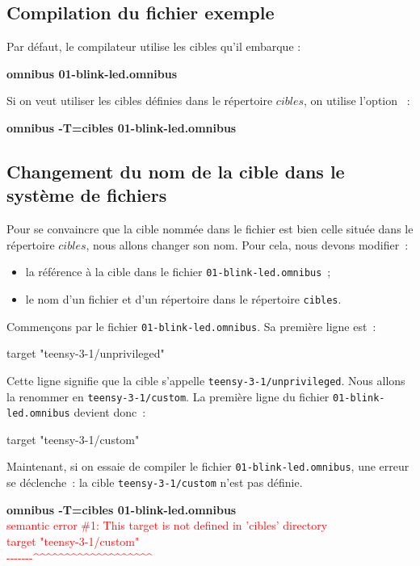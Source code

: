 \subsection{Compilation du fichier exemple}
Par défaut, le compilateur utilise les cibles qu'il embarque :
\begin{SHELL}
\bfseries omnibus 01-blink-led.omnibus
\end{SHELL}

Si on veut utiliser les cibles définies dans le répertoire $cibles$, on utilise l'option ~:
\begin{SHELL}
\bfseries omnibus -T=cibles 01-blink-led.omnibus
\end{SHELL}


\subsection{Changement du nom de la cible dans le système de fichiers}

Pour se convaincre que la cible nommée dans le fichier est bien celle située dans le répertoire $cibles$, nous allons changer son nom. Pour cela, nous devons modifier~:
\begin{itemize}
  \item la référence à la cible dans le fichier \texttt{01-blink-led.omnibus}~;
  \item le nom d'un fichier et d'un répertoire dans le répertoire \texttt{cibles}.
\end{itemize}

Commençons par le fichier \texttt{01-blink-led.omnibus}. Sa première ligne est~:

\begin{OMNIBUS}
target "teensy-3-1/unprivileged"
\end{OMNIBUS}

Cette ligne signifie que la cible s'appelle \texttt{teensy-3-1/unprivileged}. Nous allons la renommer en \texttt{teensy-3-1/custom}. La première ligne du fichier \texttt{01-blink-led.omnibus} devient donc~:

\begin{OMNIBUS}
target "teensy-3-1/custom"
\end{OMNIBUS}

Maintenant, si on essaie de compiler le fichier \texttt{01-blink-led.omnibus}, une erreur se déclenche~: la cible \texttt{teensy-3-1/custom} n'est pas définie.
\begin{SHELL}
{\bfseries omnibus -T=cibles 01-blink-led.omnibus}\\
\textcolor{red}{semantic error \#1: This target is not defined in 'cibles' directory}\\
\textcolor{red}{target "teensy-3-1/custom"}\\
\textcolor{red}{-{}-{}-{}-{}-{}-{}-\^{}\^{}\^{}\^{}\^{}\^{}\^{}\^{}\^{}\^{}\^{}\^{}\^{}\^{}\^{}\^{}\^{}\^{}\^{}}
\end{SHELL}


